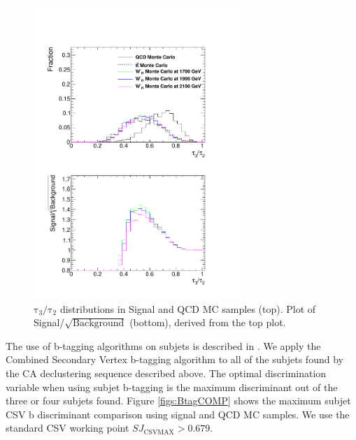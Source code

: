 \begin{figure}[htcb]
\begin{center}
\includegraphics[width=0.7\textwidth]{AN-13-004/figs/tau32Compqcdandsignal.pdf}
\caption{
$\mathrm{\tau_3/\tau_2}$ distributions in Signal and QCD MC samples (top).  Plot of Signal/$\sqrt{\text{Background}}$ (bottom), derived from the top plot.
}
\label{figs:NsubCOMP}
\end{center}
\end{figure}

The use of b-tagging algorithms on subjets is described in \cite{CMS-PAS-BTV-13-001}.  We apply the Combined Secondary Vertex b-tagging algorithm 
to all of the subjets found by the CA declustering sequence described 
above.  The optimal discrimination variable when using subjet b-tagging is the maximum discriminant out of the three or four subjets found.  
Figure \ref{figs:BtagCOMP} shows the maximum subjet CSV b discriminant comparison using signal and QCD MC samples.  We use the standard CSV working point $SJ_{\text{CSVMAX}} > 0.679$.

